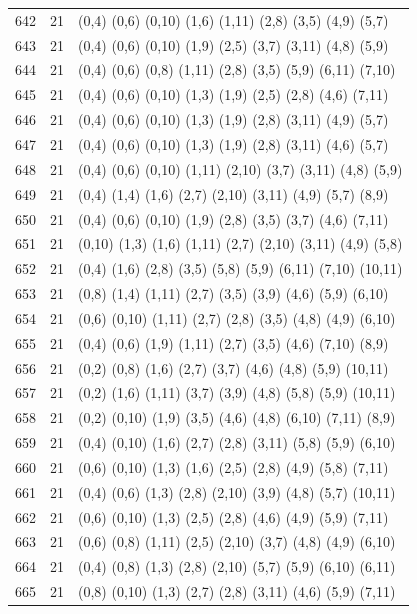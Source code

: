 {\begin{longtable}{lll}
642 & 21 & (0,4) (0,6) (0,10) (1,6) (1,11) (2,8) (3,5) (4,9) (5,7) \\
643 & 21 & (0,4) (0,6) (0,10) (1,9) (2,5) (3,7) (3,11) (4,8) (5,9) \\
644 & 21 & (0,4) (0,6) (0,8) (1,11) (2,8) (3,5) (5,9) (6,11) (7,10) \\
645 & 21 & (0,4) (0,6) (0,10) (1,3) (1,9) (2,5) (2,8) (4,6) (7,11) \\
646 & 21 & (0,4) (0,6) (0,10) (1,3) (1,9) (2,8) (3,11) (4,9) (5,7) \\
647 & 21 & (0,4) (0,6) (0,10) (1,3) (1,9) (2,8) (3,11) (4,6) (5,7) \\
648 & 21 & (0,4) (0,6) (0,10) (1,11) (2,10) (3,7) (3,11) (4,8) (5,9) \\
649 & 21 & (0,4) (1,4) (1,6) (2,7) (2,10) (3,11) (4,9) (5,7) (8,9) \\
650 & 21 & (0,4) (0,6) (0,10) (1,9) (2,8) (3,5) (3,7) (4,6) (7,11) \\
651 & 21 & (0,10) (1,3) (1,6) (1,11) (2,7) (2,10) (3,11) (4,9) (5,8) \\
652 & 21 & (0,4) (1,6) (2,8) (3,5) (5,8) (5,9) (6,11) (7,10) (10,11) \\
653 & 21 & (0,8) (1,4) (1,11) (2,7) (3,5) (3,9) (4,6) (5,9) (6,10) \\
654 & 21 & (0,6) (0,10) (1,11) (2,7) (2,8) (3,5) (4,8) (4,9) (6,10) \\
655 & 21 & (0,4) (0,6) (1,9) (1,11) (2,7) (3,5) (4,6) (7,10) (8,9) \\
656 & 21 & (0,2) (0,8) (1,6) (2,7) (3,7) (4,6) (4,8) (5,9) (10,11) \\
657 & 21 & (0,2) (1,6) (1,11) (3,7) (3,9) (4,8) (5,8) (5,9) (10,11) \\
658 & 21 & (0,2) (0,10) (1,9) (3,5) (4,6) (4,8) (6,10) (7,11) (8,9) \\
659 & 21 & (0,4) (0,10) (1,6) (2,7) (2,8) (3,11) (5,8) (5,9) (6,10) \\
660 & 21 & (0,6) (0,10) (1,3) (1,6) (2,5) (2,8) (4,9) (5,8) (7,11) \\
661 & 21 & (0,4) (0,6) (1,3) (2,8) (2,10) (3,9) (4,8) (5,7) (10,11) \\
662 & 21 & (0,6) (0,10) (1,3) (2,5) (2,8) (4,6) (4,9) (5,9) (7,11) \\
663 & 21 & (0,6) (0,8) (1,11) (2,5) (2,10) (3,7) (4,8) (4,9) (6,10) \\
664 & 21 & (0,4) (0,8) (1,3) (2,8) (2,10) (5,7) (5,9) (6,10) (6,11) \\
665 & 21 & (0,8) (0,10) (1,3) (2,7) (2,8) (3,11) (4,6) (5,9) (7,11) \\

\end{longtable}}
